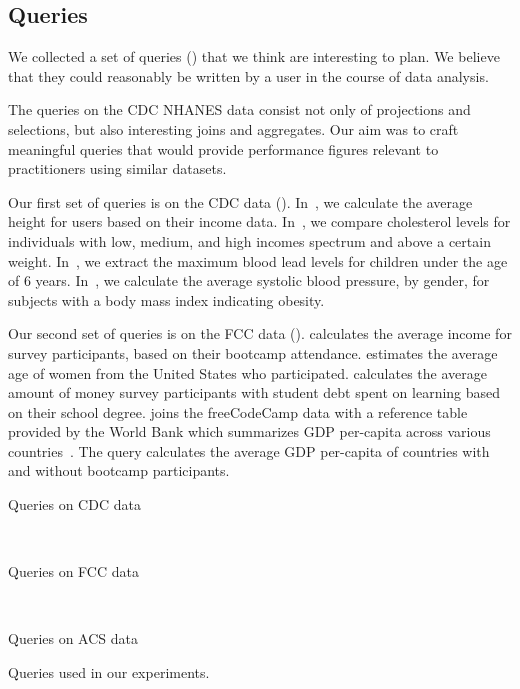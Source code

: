 \subsection{Queries}
We collected a set of queries () that we think are interesting to plan.
We believe that they could reasonably be written by a user in the course of data analysis.

The queries on the CDC NHANES data consist not only of projections and selections, but also interesting joins and aggregates.
Our aim was to craft meaningful queries
that would provide performance figures relevant to practitioners using
similar datasets.

Our first set of queries is on the CDC data (). In~, we
calculate the average height for users based on their income data. In~, we compare
cholesterol levels for individuals with low, medium, and high incomes spectrum and above a
certain weight. In~, we extract the maximum blood lead levels for children under
the age of 6 years. In~, we calculate the average systolic blood pressure, by
gender, for subjects with a body mass index indicating obesity. 

Our second set of queries is on the FCC data ().
 calculates the average income for survey participants, based on their bootcamp attendance.
 estimates the average age of women from the United States who participated.
 calculates the average amount of money survey participants with student debt spent on learning based on their school degree.
 joins the freeCodeCamp data with a reference table provided by the World Bank which summarizes GDP per-capita across various countries~\cite{worldbank-data}.
The query calculates the average GDP per-capita of countries with and without bootcamp participants. 
\begin{table}
\centering
 \begin{subtable}{\linewidth}
  
  \caption{Queries on CDC data}
  \label{fig:queries-cdc}
 \end{subtable}
 ~
 \begin{subtable}{\linewidth}
 
 \caption{Queries on FCC data}
 \label{fig:queries-fcc}
 \end{subtable}
 ~
 \begin{subtable}{\linewidth}
 
 \caption{Queries on ACS data}
 \label{fig:query-acs}
 \end{subtable}

  \caption{Queries used in our experiments.}
  \label{fig:queries}
\end{table}

